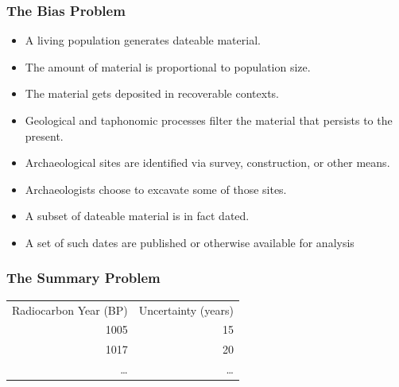 \documentclass{beamer}
\begin{document}
\begin{frame}[t]
  \frametitle{The Bias Problem}
  \pause
  \begin{itemize}
    \item A living population generates dateable material.
    \pause
    \item The amount of material is proportional to population size.
    \pause
    \item The material gets deposited in recoverable contexts.
    \pause
    \item Geological and taphonomic processes filter the material that persists to the present.
    \pause
    \item Archaeological sites are identified via survey, construction, or other means.
    \item Archaeologists choose to excavate some of those sites.
    \item A subset of dateable material is in fact dated.
    \item A set of such dates are published or otherwise available for analysis
  \end{itemize}
\end{frame}

\begin{frame}[t]
  \frametitle{The Summary Problem}
\begin{center}
	\begin{tabular}{ r r }
		Radiocarbon Year (BP) & Uncertainty (years)\\
		1005 & 15\\
		1017 & 20\\
		\ldots & \ldots\\
	\end{tabular}
\end{center}
\end{frame}
\end{document}
